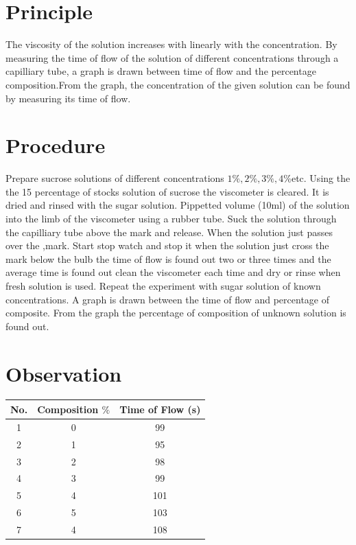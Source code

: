 \documentclass{report}
\begin{document}
\section*{Principle}

The viscosity of the solution increases with linearly with the concentration. By measuring the time of flow of the solution of different concentrations through a capilliary tube, a graph is drawn between time of flow and the percentage composition.From the graph, the concentration of the given solution can be found by measuring its time of flow.

\section*{Procedure}

Prepare sucrose solutions of different concentrations $1\%, 2\%, 3\%, 4\% $etc.  Using the the 15 percentage of stocks solution of sucrose the viscometer is cleared. It is dried and rinsed with the sugar solution. Pippetted volume (10ml) of the solution into the limb of the viscometer using a rubber tube. Suck the solution through the capilliary tube above the mark and release. When the solution just passes over the ,mark. Start stop watch and stop it when the solution just cross the mark below the bulb the time of flow is found out two or three times and the average time is found out clean the viscometer each time and dry or rinse when fresh solution is used. Repeat the experiment with sugar solution of known concentrations. A graph is drawn between the time of flow and percentage of composite. From the graph the percentage of composition of unknown solution is found out. 

\section*{Observation}

\begin{table}[H]
\begin{center}
\begin{tabular}{|c|c|c|}
\hline
No. & Composition $\%$ & Time of Flow (s)  \\ \hline
1   & 0                & 99                \\ \hline
2   & 1                & 95                \\ \hline
3   & 2                & 98                \\ \hline
4   & 3                & 99               \\ \hline
5   & 4                & 101               \\ \hline
6   & 5                & 103               \\ \hline
7   & 4                & 108               \\ \hline
\end{tabular}
\end{center}
\end{table}
\end{document}
